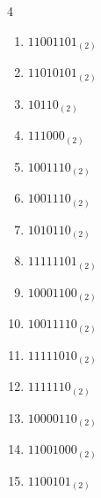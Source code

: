 \begin{multicols}{4}
\begin{enumerate}
        \phantom{$=98$}

  \item $11001101_{(2)}$

        \phantom{$=205$}

\columnbreak %

\resetques

  \item $11010101_{(2)}$

        \phantom{$=213$}

  \item $10110_{(2)}$

        \phantom{$=22$}

  \item $111000_{(2)}$

        \phantom{$=56$}

  \item $1001110_{(2)}$

        \phantom{$=78$}

  \item $1001110_{(2)}$

        \phantom{$=78$}

  \item $1010110_{(2)}$

        \phantom{$=86$}

  \item $11111101_{(2)}$

        \phantom{$=253$}

  \item $10001100_{(2)}$

        \phantom{$=140$}

  \item $10011110_{(2)}$

        \phantom{$=158$}

  \item $11111010_{(2)}$

        \phantom{$=250$}

  \item $1111110_{(2)}$

        \phantom{$=126$}

  \item $10000110_{(2)}$

        \phantom{$=134$}

  \item $11001000_{(2)}$

        \phantom{$=200$}

  \item $1100101_{(2)}$


\end{enumerate}
\end{multicols}
